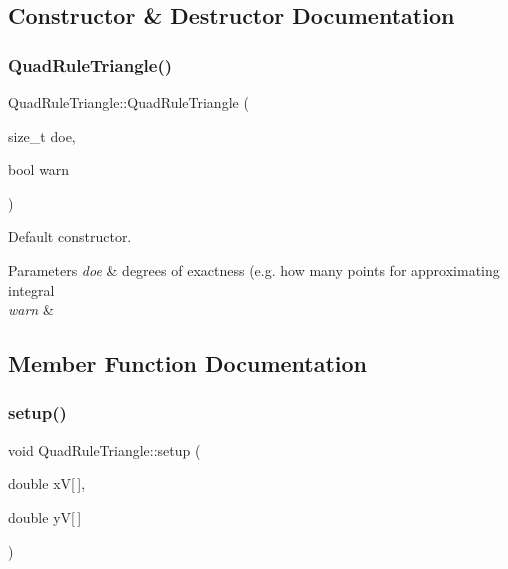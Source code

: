 \subsection{Constructor \& Destructor Documentation}
\mbox{\label{classMeshFramework2D_1_1QuadRuleTriangle_a83a432b56c03fffa615ec85f5dfd57d7}} 
\subsubsection{\texorpdfstring{Quad\+Rule\+Triangle()}{QuadRuleTriangle()}}
{\footnotesize\ttfamily Quad\+Rule\+Triangle\+::\+Quad\+Rule\+Triangle (\begin{DoxyParamCaption}\item[{size\+\_\+t}]{doe,  }\item[{bool}]{warn }\end{DoxyParamCaption})}



Default constructor. 


\begin{DoxyParams}{Parameters}
{\em doe} & degrees of exactness (e.\+g. how many points for approximating integral \\
\hline
{\em warn} & \\
\hline
\end{DoxyParams}


\subsection{Member Function Documentation}
\mbox{\label{classMeshFramework2D_1_1QuadRuleTriangle_aa2cd3081837b1cb46f6573ceb16de7b2}} 
\subsubsection{\texorpdfstring{setup()}{setup()}}
{\footnotesize\ttfamily void Quad\+Rule\+Triangle\+::setup (\begin{DoxyParamCaption}\item[{double}]{xV\mbox{[}$\,$\mbox{]},  }\item[{double}]{yV\mbox{[}$\,$\mbox{]} }\end{DoxyParamCaption})}



